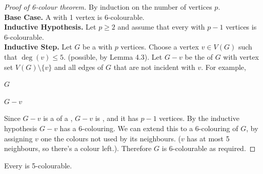 \documentclass[english, 11pt]{article}
\begin{document}
\begin{proof}[Proof of 6-colour theorem]
  By induction on the number of vertices $p$. \\

  \textbf{Base Case.} A  with 1 vertex is 6-colourable. \\

  \textbf{Inductive Hypothesis.} Let $p \geq 2$ and assume that every  with $p - 1$ vertices is 6-colourable. \\

  \textbf{Inductive Step.} Let $G$ be a  with $p$ vertices. Choose a vertex $v \in V(G)$ such that $\deg(v) \leq 5$. (possible, by Lemma 4.3). Let $G - v$ be the  of $G$ with vertex set $V(G) \setminus \{v\}$ and all edges of $G$ that are not incident with $v$. For example,
  \begin{center}$G$
  $G-v$
\end{center}
Since $G - v$ is a  of a , $G - v$ is , and it has $p - 1$ vertices. By the inductive hypothesis $G-v$ has a 6-colouring. We can extend this to a 6-colouring of $G$, by assigning $v$ one the colours not used by its neighbours. ($v$ has at most 5 neighbours, so there's a colour left.). Therefore $G$ is 6-colourable as required.
\end{proof}

\begin{thrm}\label{5colour}
Every  is 5-colourable.
\end{thrm}
\end{document}

